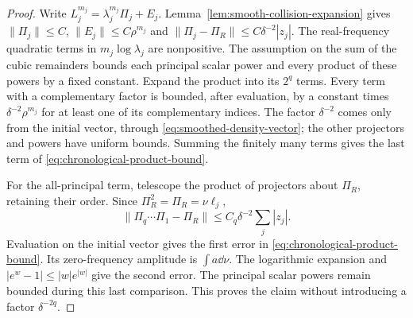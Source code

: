 \begin{proof}
Write $L_j^{m_j}=\lambda_j^{m_j}\Pi_j+E_j$.
Lemma~\ref{lem:smooth-collision-expansion} gives
$\|\Pi_j\|\le C$, $\|E_j\|\le C\rho^{m_j}$ and
$\|\Pi_j-\Pi_R\|\le C\delta^{-2}|z_j|$.
The real-frequency quadratic terms in $m_j\log\lambda_j$ are
nonpositive. The assumption on the sum of the cubic remainders bounds
each principal scalar power and every product of these powers by a
fixed constant. Expand the product into its $2^q$ terms. Every term
with a complementary factor is bounded, after evaluation, by a
constant times $\delta^{-2}\rho^{m_j}$ for at least one of its
complementary indices. The factor $\delta^{-2}$ comes only from the
initial vector, through \eqref{eq:smoothed-density-vector}; the other
projectors and powers have uniform bounds. Summing the finitely many
terms gives the last term of \eqref{eq:chronological-product-bound}.

For the all-principal term, telescope the product of projectors about
$\Pi_R$, retaining their order. Since $\Pi_R^2=\Pi_R=\nu\ell_j$,
\[
 \|\Pi_q\cdots\Pi_1-\Pi_R\|
       \le C_q\delta^{-2}\sum_j|z_j|.
\]
Evaluation on the initial vector gives the first error in
\eqref{eq:chronological-product-bound}. Its zero-frequency amplitude
is $\int a\dd\nu$. The logarithmic expansion and
$|e^w-1|\le |w|e^{|w|}$ give the second error. The principal scalar
powers remain bounded during this last comparison. This proves the
claim without introducing a factor $\delta^{-2q}$.
\end{proof}

